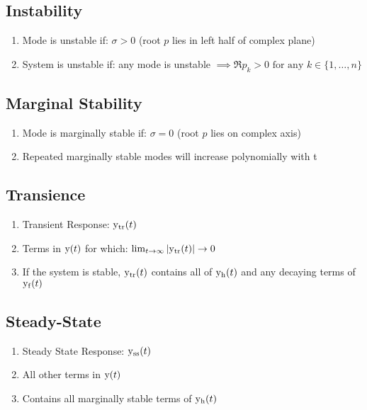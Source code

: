 \documentclass[8pt]{extarticle}
\begin{document}
\begin{multicols*}{3}
\subsection*{Instability}
\begin{enumerate}
    \item Mode is unstable if: \( \sigma > 0 \) (root \( p \) lies in left half of complex plane)
    \item System is unstable if: any mode is unstable \( \implies \Re{p_k} > 0 \text{ for any } k \in \{1, \dots, n\} \)
\end{enumerate}

\subsection*{Marginal Stability}
\begin{enumerate}
    \item Mode is marginally stable if: \( \sigma = 0 \) (root \( p \) lies on complex axis)
    \item Repeated marginally stable modes will increase polynomially with t
\end{enumerate}

\subsection*{Transience}
\begin{enumerate}
    \item Transient Response: \( \func{y_{\text{tr}}}[t] \)
    \item Terms in \( \func{y}[t] \) for which: \( \lim_{t \to \infty} | \func{y_{\text{tr}}}[t] | \to 0 \)
    \item If the system is stable, \( \func{y_{\text{tr}}}[t] \) contains all of \( \func{y_h}[t] \) and any decaying terms of \( \func{y_f}[t] \)
\end{enumerate}

\subsection*{Steady-State}
\begin{enumerate}
    \item Steady State Response: \( \func{y_{\text{ss}}}[t] \)
    \item All other terms in \( \func{y}[t] \)
    \item Contains all marginally stable terms of \( \func{y_h}[t] \)
\end{enumerate}


\end{multicols*}
\end{document}
